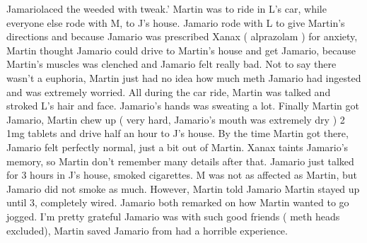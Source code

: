 \documentclass[12pt]{book}
\begin{document}
Jamariolaced the weeded with tweak.' Martin was to ride in L's car, while everyone else rode with M, to J's house. Jamario rode with L to give Martin's directions and because Jamario was prescribed Xanax ( alprazolam ) for anxiety, Martin thought Jamario could drive to Martin's house and get Jamario, because Martin's muscles was clenched and Jamario felt really bad. Not to say there wasn't a euphoria, Martin just had no idea how much meth Jamario had ingested and was extremely worried. All during the car ride, Martin was talked and stroked L's hair and face. Jamario's hands was sweating a lot. Finally Martin got Jamario, Martin chew up ( very hard, Jamario's mouth was extremely dry ) 2 1mg tablets and drive half an hour to J's house. By the time Martin got there, Jamario felt perfectly normal, just a bit out of Martin. Xanax taints Jamario's memory, so Martin don't remember many details after that. Jamario just talked for 3 hours in J's house, smoked cigarettes. M was not as affected as Martin, but Jamario did not smoke as much. However, Martin told Jamario Martin stayed up until 3, completely wired. Jamario both remarked on how Martin wanted to go jogged. I'm pretty grateful Jamario was with such good friends ( meth heads excluded), Martin saved Jamario from had a horrible experience.
\end{document}
